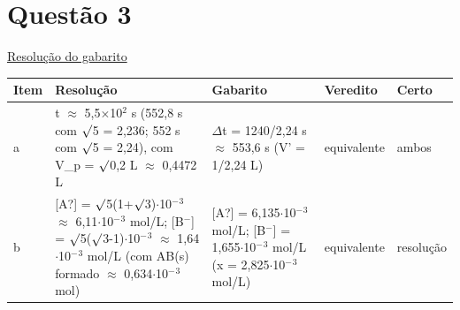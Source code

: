 \documentclass{article}%
\begin{document}
\section*{Questão 3}%
\href{https://poliedroresolve.sistemapoliedro.com.br/vestibulares/ita/2026/ita-2-fase-dia-2-29-10-2025-2-fase-dia-2/dissertativa-3-quimica-2-fase-dia-2-ita-2026}{Resolução do gabarito}\par\smallskip%
\begin{longtable}{@{}p{} p{} p{} p{} p{}@{}}\toprule Item & Resolução & Gabarito & Veredito & Certo \\ \midrule
a & t $\approx$ 5,5$\times$10$^2$ s (552,8 s com $\surd$5 = 2,236; 552 s com $\surd$5 = 2,24), com V\_p = $\surd$0,2 L $\approx$ 0,4472 L & $\Delta$t = 1240/2,24 s $\approx$ 553,6 s (V' = 1/2,24 L) & equivalente & ambos \\
b & {[}A?{]} = $\surd$5(1+$\surd$3)$\cdot$10$^{-}$$^3$ $\approx$ 6,11$\cdot$10$^{-}$$^3$ mol/L; {[}B$^{-}${]} = $\surd$5($\surd$3-1)$\cdot$10$^{-}$$^3$ $\approx$ 1,64$\cdot$10$^{-}$$^3$ mol/L (com AB(s) formado $\approx$ 0,634$\cdot$10$^{-}$$^3$ mol) & {[}A?{]} = 6,135$\cdot$10$^{-}$$^3$ mol/L; {[}B$^{-}${]} = 1,655$\cdot$10$^{-}$$^3$ mol/L (x = 2,825$\cdot$10$^{-}$$^3$ mol/L) & equivalente & resolução \\
\bottomrule\end{longtable}%
\end{document}
